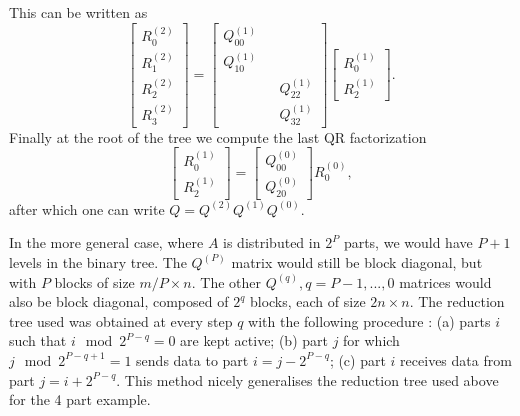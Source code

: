 \documentclass[a4paper, 12pt,oneside]{article}
\begin{document}
		This can be written as
		$$
		\left[\begin{array}{c}
		{R}_0^{(2)} \\
		{R}_1^{(2)} \\
		{R}_2^{(2)} \\
		{R}_3^{(2)}
		\end{array}\right]=\left[\begin{array}{ccc}
			{Q}_{00}^{(1)} & & \\
			{Q}_{10}^{(1)} & & \\
			& & {Q}_{22}^{(1)} \\
			& & {Q}_{32}^{(1)} 
		\end{array}\right]\left[\begin{array}{c}
		R_0^{(1)} \\
		R_2^{(1)}
		\end{array}\right].
		$$
		Finally at the root of the tree we compute the last QR factorization
		$$
		\left[\begin{array}{c}
		R_0^{(1)} \\
		R_2^{(1)}
		\end{array}\right]=\left[\begin{array}{c}
			{Q}_{00}^{(0)} \\
			{Q}_{20}^{(0)}
		\end{array}\right]
		R_0^{(0)},
		$$
		after which one can write ${Q}=Q^{(2)}Q^{(1)}Q^{(0)}$.

		In the more general case, where $A$ is distributed in $2^P$ parts, we would have $P+1$ levels in the binary tree. The $Q^{(P)}$ matrix would still be block diagonal, but with $P$ blocks of size $m/P\times n$. The other $Q^{(q)}, q=P-1,...,0$ matrices would also be block diagonal, composed of $2^q$ blocks, each of size $2n\times n$. 
		The reduction tree used was obtained at every step $q$ with the following procedure :
		(a) parts $i$ such that $i\mod 2^{P-q}=0$ are kept active; (b) part $j$ for which $j\mod 2^{P-q+1}=1$ sends data to part $i=j-2^{P-q}$; (c) part $i$ receives data from part $j=i+2^{P-q}$. This method nicely generalises the reduction tree used above for the 4 part example. 
\end{document}
